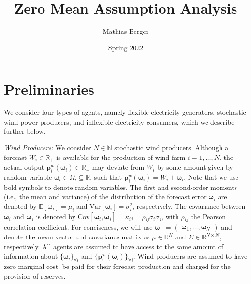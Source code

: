 \documentclass{article}
\title{Zero Mean Assumption Analysis}
\author{Mathias Berger}
\date{Spring 2022}
\begin{document}
\maketitle

\section{Preliminaries}

We consider four types of agents, namely flexible electricity generators, stochastic wind power producers, and inflexible electricity consumers, which we describe further below.

\textit{Wind Producers}: We consider $N \in \mathbb{N}$ stochastic wind producers. Although a forecast $W_i \in \mathbb{R}_+$ is available for the production of wind farm $i = 1, \ldots, N$, the actual output $\mathbf{p}_i^w(\boldsymbol{\omega}_i) \in \mathbb{R}_+$ may deviate from $W_i$ by some amount given by random variable $\boldsymbol{\omega}_i \in \Omega_i \subseteq \mathbb{R}$, such that $\mathbf{p}_i^w(\boldsymbol{\omega}_i) = W_i + \boldsymbol{\omega}_i$. Note that we use bold symbols to denote random variables. The first and second-order moments (i.e., the mean and variance) of the distribution of the forecast error $\boldsymbol{\omega}_i$ are denoted by $\mathbb{E}[\boldsymbol{\omega}_i] = \mu_i$ and $\mbox{Var}[\boldsymbol{\omega}_i] = \sigma_i^2$, respectively. The covariance between $\boldsymbol{\omega}_i$ and $\boldsymbol{\omega}_j$ is denoted by $\mbox{Cov}[\boldsymbol{\omega}_i, \boldsymbol{\omega}_j] = \kappa_{ij} = \rho_{ij} \sigma_i \sigma_j$, with $\rho_{ij}$ the Pearson correlation coefficient. For conciseness, we will use $\boldsymbol{\omega}^\top = \begin{pmatrix} \boldsymbol{\omega}_1, \ldots, \boldsymbol{\omega}_N \end{pmatrix}$ and denote the mean vector and covariance matrix as $\mu \in \mathbb{R}^N$ and $\Sigma \in \mathbb{R}^{N \times N}$, respectively. All agents are assumed to have access to the same amount of information about $\{\boldsymbol{\omega}_i\}_{\forall i}$ and $\{\mathbf{p}_i^w(\boldsymbol{\omega}_i)\}_{\forall i}$. Wind producers are assumed to have zero marginal cost, be paid for their forecast production and charged for the provision of reserves.
\end{document}
